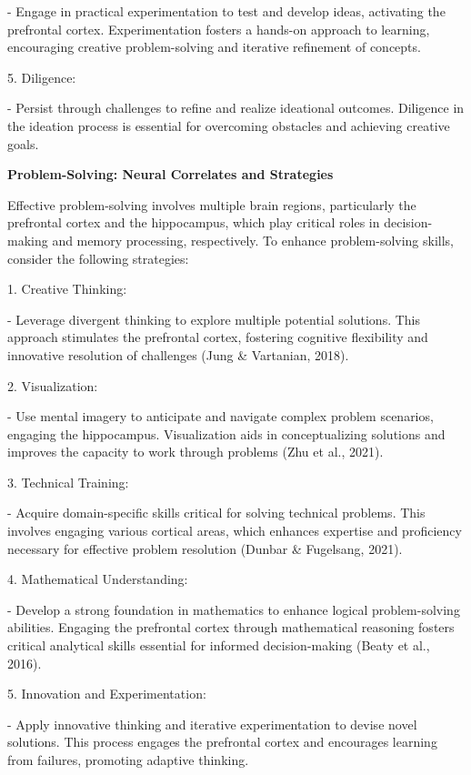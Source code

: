 \documentclass[
]{article}
\begin{document}
- Engage in practical experimentation to test and develop ideas,
activating the prefrontal cortex. Experimentation fosters a hands-on
approach to learning, encouraging creative problem-solving and iterative
refinement of concepts.

5. Diligence:

- Persist through challenges to refine and realize ideational outcomes.
Diligence in the ideation process is essential for overcoming obstacles
and achieving creative goals.

\textbf{Problem-Solving: Neural Correlates and Strategies}

Effective problem-solving involves multiple brain regions, particularly
the prefrontal cortex and the hippocampus, which play critical roles in
decision-making and memory processing, respectively. To enhance
problem-solving skills, consider the following strategies:

1. Creative Thinking:

- Leverage divergent thinking to explore multiple potential solutions.
This approach stimulates the prefrontal cortex, fostering cognitive
flexibility and innovative resolution of challenges (Jung \& Vartanian,
2018).

2. Visualization:

- Use mental imagery to anticipate and navigate complex problem
scenarios, engaging the hippocampus. Visualization aids in
conceptualizing solutions and improves the capacity to work through
problems (Zhu et al., 2021).

3. Technical Training:

- Acquire domain-specific skills critical for solving technical
problems. This involves engaging various cortical areas, which enhances
expertise and proficiency necessary for effective problem resolution
(Dunbar \& Fugelsang, 2021).

4. Mathematical Understanding:

- Develop a strong foundation in mathematics to enhance logical
problem-solving abilities. Engaging the prefrontal cortex through
mathematical reasoning fosters critical analytical skills essential for
informed decision-making (Beaty et al., 2016).

5. Innovation and Experimentation:

- Apply innovative thinking and iterative experimentation to devise
novel solutions. This process engages the prefrontal cortex and
encourages learning from failures, promoting adaptive thinking.
\end{document}
